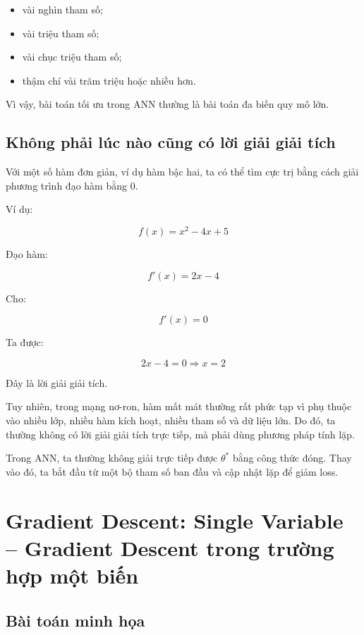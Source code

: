 \begin{itemize}
    \item vài nghìn tham số;
    \item vài triệu tham số;
    \item vài chục triệu tham số;
    \item thậm chí vài trăm triệu hoặc nhiều hơn.
\end{itemize}

Vì vậy, bài toán tối ưu trong ANN thường là bài toán đa biến quy mô lớn.

\subsection{Không phải lúc nào cũng có lời giải giải tích}

Với một số hàm đơn giản, ví dụ hàm bậc hai, ta có thể tìm cực trị bằng cách giải phương trình đạo hàm bằng 0.

Ví dụ:

\[
    f(x) = x^2 - 4x + 5
\]

Đạo hàm:

\[
    f'(x) = 2x - 4
\]

Cho:

\[
    f'(x)=0
\]

Ta được:

\[
    2x-4=0 \Rightarrow x=2
\]

Đây là lời giải giải tích.

Tuy nhiên, trong mạng nơ-ron, hàm mất mát thường rất phức tạp vì phụ thuộc vào nhiều lớp, nhiều hàm kích hoạt, nhiều tham số và dữ liệu lớn. Do đó, ta thường không có lời giải giải tích trực tiếp, mà phải dùng phương pháp tính lặp.

\begin{ghinho}
Trong ANN, ta thường không giải trực tiếp được $\theta^*$ bằng công thức đóng. Thay vào đó, ta bắt đầu từ một bộ tham số ban đầu và cập nhật lặp để giảm loss.
\end{ghinho}

\section{Gradient Descent: Single Variable -- Gradient Descent trong trường hợp một biến}

\subsection{Bài toán minh họa}

